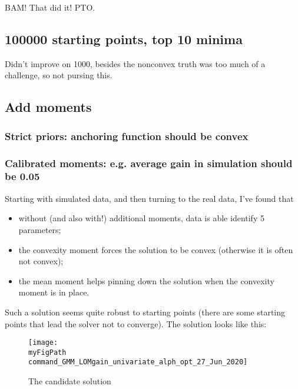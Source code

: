 \documentclass[11pt]{article}
\def \myFigPath {../../figures/}
\renewcommand{\[}{\begin{equation}}
\renewcommand{\]}{\end{equation}}
\def\mySmallFigScale{0.22}
\def\myTinyFigScale{0.16}
\begin{document}
BAM! That did it! PTO.

\clearpage
\subsection{100000 starting points, top 10 minima}
Didn't improve on 1000, besides the nonconvex truth was too much of a challenge, so not pursing this.

\subsection{Add moments}
\subsubsection{Strict priors: anchoring function should be convex}
\subsubsection{Calibrated moments: e.g. average gain in simulation should be 0.05}

Starting with simulated data, and then turning to the real data, I've found that 
\begin{itemize}
\item without (and also with!) additional moments, data is able identify 5 parameters;
\item the convexity moment forces the solution to be convex (otherwise it is often not convex);
\item the mean moment helps pinning down the solution when the convexity moment is in place.
\end{itemize}
Such a solution seems quite robust to starting points (there are some starting points that lead the solver not to converge). The solution looks like this:
\begin{figure}[h!]
\texttt{[image: \\myFigPath command\_GMM\_LOMgain\_univariate\_alph\_opt\_27\_Jun\_2020]}
\caption{The candidate solution}
\end{figure}
\end{document}
